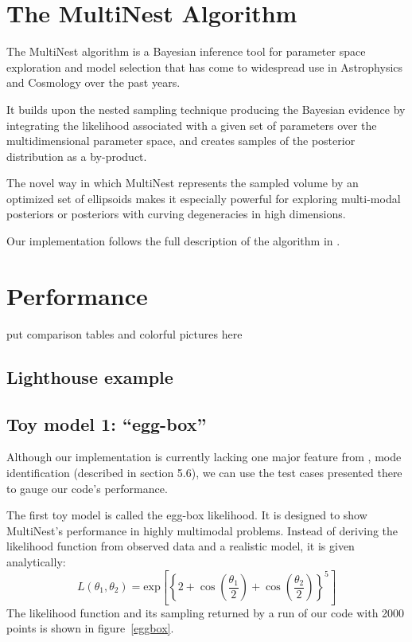 \documentclass{article}
\begin{document}
\section{The MultiNest Algorithm}
The MultiNest algorithm is a Bayesian inference tool for parameter space exploration and model selection that has come to widespread use in Astrophysics and Cosmology over the past years. 

It builds upon the nested sampling technique producing the Bayesian evidence by integrating the likelihood associated with a given set of parameters over the multidimensional parameter space, and creates samples of the posterior distribution as a by-product.

The novel way in which MultiNest represents the sampled volume by an optimized set of ellipsoids makes it especially powerful for exploring multi-modal posteriors or posteriors with curving degeneracies in high dimensions.

Our implementation follows the full description of the algorithm in \cite{2009MNRAS.398.1601F}.
\section{Performance}
put comparison tables and colorful pictures here
\subsection{Lighthouse example}

\subsection{Toy model 1: ``egg-box''}
Although our implementation is currently lacking one major feature from  \cite{2009MNRAS.398.1601F}, mode identification (described in section 5.6), we can use the test cases presented there to gauge our code's performance.

The first toy model is called the egg-box likelihood. It is designed to show MultiNest's performance in highly multimodal problems. Instead of deriving the likelihood function from observed data and a realistic model, it is given analytically:
\[L(\theta_1,\theta_2) = \mathrm{exp}
\left[\left\{2+\cos\left(\frac{\theta_1}{2}\right)+\cos\left(\frac{\theta_2}{2}\right)\right\}^5\right]\]
The likelihood function and its sampling returned by a run of our code with 2000 points is shown in figure~\ref{eggbox}.
\end{document}
